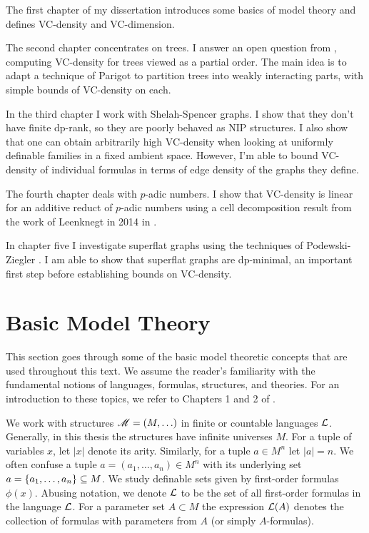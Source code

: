The first chapter of my dissertation introduces some basics of model theory and defines VC-density and VC-dimension.

The second chapter concentrates on trees.
I answer an open question from \cite{density}, computing VC-density for trees viewed as a partial order.
The main idea is to adapt a technique of Parigot \cite{parigot_trees} to partition trees into weakly interacting parts, with simple bounds of VC-density on each.

In the third chapter I work with Shelah-Spencer graphs.
I show that they don't have finite dp-rank, so they are poorly behaved as NIP structures.
I also show that one can obtain arbitrarily high VC-density when looking at uniformly definable families in a fixed ambient space.
However, I'm able to bound VC-density of individual formulas in terms of edge density of the graphs they define.

The fourth chapter deals with $p$-adic numbers.
I show that VC-density is linear for an additive reduct of $p$-adic numbers
using a cell decomposition result from the work of Leenknegt in 2014 in \cite{reduct}.

In chapter five I investigate superflat graphs using the techniques of
Podewski-Ziegler \cite {stable_graphs}.
I am able to show that superflat graphs are dp-minimal, an important first step before establishing bounds on VC-density.

\section{Basic Model Theory}

This section goes through some of the basic model theoretic concepts that are used throughout this text.
We assume the reader's familiarity with the fundamental notions of languages, formulas, structures, and theories.
For an introduction to these topics, we refer to Chapters 1 and 2 of \cite{tent}.

We work with structures $\mathscr M = (M, \ldots)$ in finite or countable languages $\mathcal L$.
Generally, in this thesis the structures have infinite universes $M$.
For a tuple of variables $x$, let $|x|$ denote its arity.
Similarly, for a tuple $a \in M^n$ let $|a|=n$.
We often confuse a tuple $a = (a_1, \ldots, a_n) \in M^n$ with its underlying set $a = \left\{a_1, \ldots, a_n\right\} \subseteq M$.
We study definable sets given by first-order formulas $\phi(x)$.
Abusing notation, we denote $\mathcal L$ to be the set of all first-order formulas in the language $\mathcal L$.
For a parameter set $A \subset M$ the expression $\mathcal L(A)$ denotes the collection of formulas
with parameters from $A$ (or simply $A$-formulas).

